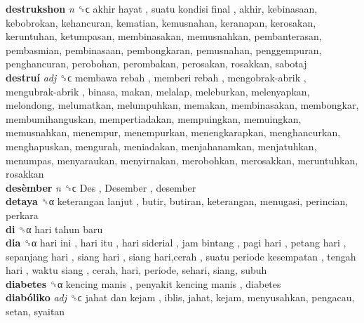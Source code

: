 \textbf{destrukshon} \emph{n}  ␝ϲ   akhir hayat ,  suatu kondisi final , akhir, kebinasaan, kebobrokan, kehancuran, kematian, kemusnahan, keranapan, kerosakan, keruntuhan, ketumpasan, membinasakan, memusnahkan, pembanterasan, pembasmian, pembinasaan, pembongkaran, pemusnahan, penggempuran, penghancuran, perobohan, perombakan, perosakan, rosakkan, sabotaj  \\
\textbf{destruí} \emph{adj}  ␝ϲ   membawa rebah ,  memberi rebah ,  mengobrak-abrik ,  mengubrak-abrik , binasa, makan, melalap, meleburkan, melenyapkan, melondong, melumatkan, melumpuhkan, memakan, membinasakan, membongkar, membumihanguskan, mempertiadakan, mempuingkan, memuingkan, memusnahkan, menempur, menempurkan, menengkarapkan, menghancurkan, menghapuskan, mengurah, meniadakan, menjahanamkan, menjatuhkan, menumpas, menyaraukan, menyirnakan, merobohkan, merosakkan, meruntuhkan, rosakkan  \\
\textbf{desèmber} \emph{n}  ␝ϲ   Des ,  Desember , desember  \\
\textbf{detaya} ␝α   keterangan lanjut , butir, butiran, keterangan, menugasi, perincian, perkara  \\
\textbf{di} ␝α   hari tahun baru   \\
\textbf{dia} ␝α   hari ini ,  hari itu ,  hari siderial ,  jam bintang ,  pagi hari ,  petang hari ,  sepanjang hari ,  siang hari ,  siang hari,cerah ,  suatu periode kesempatan ,  tengah hari ,  waktu siang , cerah, hari, periode, sehari, siang, subuh  \\
\textbf{diabetes} ␝α   kencing manis ,  penyakit kencing manis , diabetes  \\
\textbf{diabóliko} \emph{adj}  ␝ϲ   jahat dan kejam , iblis, jahat, kejam, menyusahkan, pengacau, setan, syaitan  \\
